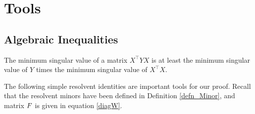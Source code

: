 \section{Tools}\label{app_tool}

\subsection{Algebraic Inequalities}

\begin{fact}\label{fact_proof_gA}
	The minimum singular value of a matrix $X^{\top}YX$ is at least the minimum singular value of $Y$ times the minimum singular value of $X^{\top}X$.
\end{fact}

The following simple resolvent identities are important tools for our proof. Recall that the resolvent minors have been defined in Definition \ref{defn_Minor}, and matrix $F$ is given in equation \eqref{diagW}.
